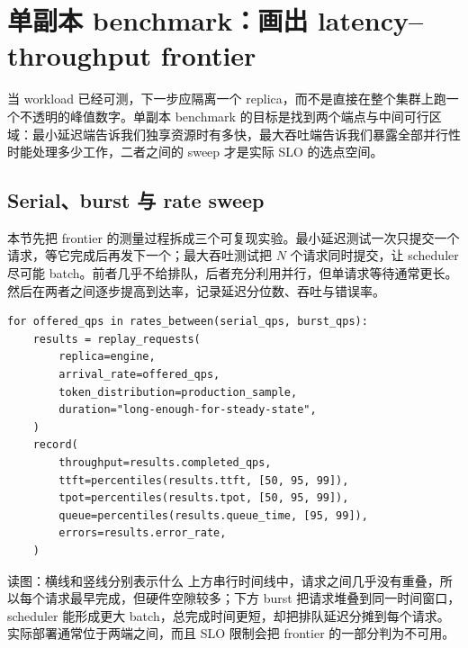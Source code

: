 \section{单副本 benchmark：画出 latency--throughput frontier}

当 workload 已经可测，下一步应隔离一个 replica，而不是直接在整个集群上跑一个不透明的峰值数字。单副本 benchmark 的目标是找到两个端点与中间可行区域：最小延迟端告诉我们独享资源时有多快，最大吞吐端告诉我们暴露全部并行性时能处理多少工作，二者之间的 sweep 才是实际 SLO 的选点空间。

\subsection{Serial、burst 与 rate sweep}

本节先把 frontier 的测量过程拆成三个可复现实验。最小延迟测试一次只提交一个请求，等它完成后再发下一个；最大吞吐测试把 $N$ 个请求同时提交，让 scheduler 尽可能 batch。前者几乎不给排队，后者充分利用并行，但单请求等待通常更长。然后在两者之间逐步提高到达率，记录延迟分位数、吞吐与错误率。


\begin{lstlisting}[caption={单副本 latency--throughput sweep 伪代码}]
for offered_qps in rates_between(serial_qps, burst_qps):
    results = replay_requests(
        replica=engine,
        arrival_rate=offered_qps,
        token_distribution=production_sample,
        duration="long-enough-for-steady-state",
    )
    record(
        throughput=results.completed_qps,
        ttft=percentiles(results.ttft, [50, 95, 99]),
        tpot=percentiles(results.tpot, [50, 95, 99]),
        queue=percentiles(results.queue_time, [95, 99]),
        errors=results.error_rate,
    )
\end{lstlisting}


\begin{knowledgebox}{读图：横线和竖线分别表示什么}
上方串行时间线中，请求之间几乎没有重叠，所以每个请求最早完成，但硬件空隙较多；下方 burst 把请求堆叠到同一时间窗口，scheduler 能形成更大 batch，总完成时间更短，却把排队延迟分摊到每个请求。实际部署通常位于两端之间，而且 SLO 限制会把 frontier 的一部分判为不可用。
\end{knowledgebox}

